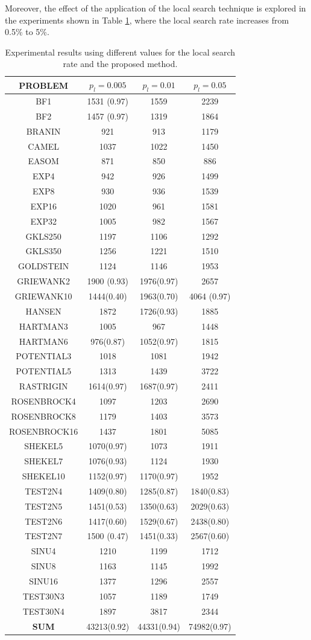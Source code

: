 \documentclass[journal,article,submit,pdftex,moreauthors]{Definitions/mdpi}
\begin{document}
Moreover, the effect of the  application of the local search technique is explored in the experiments shown in Table \ref{tab:lrate}, where the local search rate increases from 0.5\% to 5\%. 
\begin{table}[H]
\caption{ Experimental results using different values for the local search rate and the proposed method.\label{tab:lrate}} 
\begin{center}
    \begin{tabular}{|c|c|c|c|}
    \hline 
\textbf{PROBLEM
} & $p_l=0.005$ & 
$p_l=0.01$ & 
$p_l=0.05$ \tabularnewline
    \hline 
BF1 & 1531 (0.97) & 1559 & 2239 \tabularnewline
    \hline 
BF2	& 1457 (0.97)	& 1319	& 1864
\tabularnewline
    \hline 
BRANIN 	& 921	& 913	& 	1179\tabularnewline
    \hline 
CAMEL &	1037 & 1022	& 1450 	\tabularnewline
    \hline 
EASOM &	871 & 850	&	886 
\tabularnewline
    \hline 
EXP4 	& 942	& 926	& 1499		
\tabularnewline
    \hline 
EXP8 	& 930 & 936 & 1539		
\tabularnewline
    \hline 
EXP16 &	1020	& 961	&1581	
\tabularnewline
    \hline 
EXP32 &	1005 & 982	& 1567 	
\tabularnewline
    \hline 
GKLS250 	&  1197 & 1106	& 	1292	
\tabularnewline
    \hline 
GKLS350 &	1256	& 1221 & 1510	
\tabularnewline
    \hline 
GOLDSTEIN 	& 	1124 & 1146& 1953
\tabularnewline
    \hline 
GRIEWANK2 &	1900 (0.93)	& 1976(0.97) &	2657
\tabularnewline
    \hline 
GRIEWANK10 &		1444(0.40)	& 1963(0.70) & 4064 (0.97)
\tabularnewline
    \hline 
HANSEN &	1872 &	1726(0.93)	& 1885
\tabularnewline
    \hline 
HARTMAN3 &	1005 & 967	 & 1448 
\tabularnewline
    \hline 
HARTMAN6 &	976(0.87)	&	1052(0.97)	&	1815
\tabularnewline
    \hline 
POTENTIAL3 	& 1018 & 1081	&	1942 
\tabularnewline
    \hline 
POTENTIAL5 &		1313	& 1439 & 3722	
\tabularnewline
    \hline 
RASTRIGIN &	1614(0.97) 	&	1687(0.97) &	2411
\tabularnewline
    \hline 
ROSENBROCK4 &	1097 & 1203 &	 2690	
\tabularnewline
    \hline 

ROSENBROCK8 &	1179	& 1403 &	3573
 \tabularnewline
    \hline 
ROSENBROCK16 &	1437 & 1801	&	5085
\tabularnewline
    \hline 
SHEKEL5 &	1070(0.97)	&	1073 &	1911	
\tabularnewline
    \hline 
SHEKEL7 &		1076(0.93)	 & 1124 &	1930	
 \tabularnewline
    \hline 
SHEKEL10 &		1152(0.97) & 1170(0.97) &	1952	
\tabularnewline
    \hline 
TEST2N4 &	1409(0.80) &	1285(0.87)	&	1840(0.83)
 \tabularnewline
    \hline 
TEST2N5 &	1451(0.53)	&	1350(0.63) &	2029(0.63)
\tabularnewline
    \hline 
TEST2N6 &	1417(0.60) &	1529(0.67)	&	2438(0.80)
\tabularnewline
    \hline 
TEST2N7	&  1500 (0.47) & 1451(0.33)	&	2567(0.60)
\tabularnewline
    \hline 
SINU4 &	1210 & 1199 &	 1712 
\tabularnewline
    \hline 
SINU8 &	1163 & 1145	&	1992 
 \tabularnewline
    \hline 
SINU16 	& 1377 	&	1296 &	2557	
\tabularnewline
    \hline 
TEST30N3 	& 1057 & 1189 &	 1749	
 \tabularnewline
    \hline 
TEST30N4  &	1897  & 3817	&	2344
\tabularnewline
    \hline 
\textbf{SUM}  &	43213(0.92)	&	44331(0.94)	&	74982(0.97)
\tabularnewline
    \hline 
\end{tabular}
\end{center}
\end{table}
\end{document}
